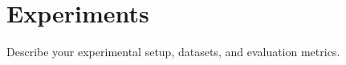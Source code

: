 \section{Experiments}
\label{sec:exp}

Describe your experimental setup, datasets, and evaluation metrics.
